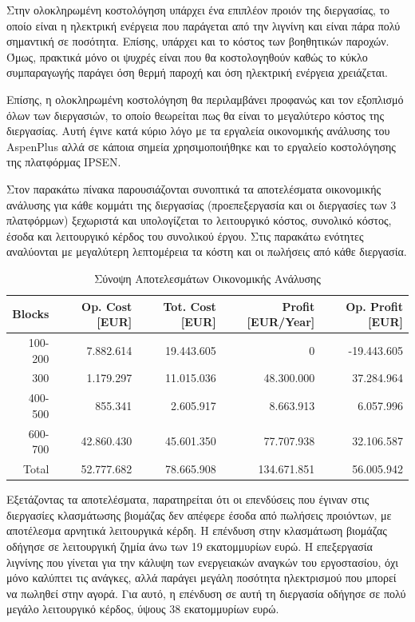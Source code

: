 \documentclass[11pt]{article}
\begin{document}
Στην ολοκληρωμένη κοστολόγηση υπάρχει ένα επιπλέον προιόν της διεργασίας, το οποίο είναι η ηλεκτρική ενέργεια που παράγεται από την λιγνίνη και είναι πάρα πολύ σημαντική σε ποσότητα. Επίσης, υπάρχει και το κόστος των βοηθητικών παροχών. Όμως, πρακτικά μόνο οι ψυχρές είναι που θα κοστολογηθούν καθώς το κύκλο συμπαραγωγής παράγει όση θερμή παροχή και όση ηλεκτρική ενέργεια χρειάζεται.

Επίσης, η ολοκληρωμένη κοστολόγηση θα περιλαμβάνει προφανώς και τον εξοπλισμό όλων των διεργασιών, το οποίο θεωρείται πως θα είναι το μεγαλύτερο κόστος της διεργασίας. Αυτή έγινε κατά κύριο λόγο με τα εργαλεία οικονομικής ανάλυσης του AspenPlus αλλά σε κάποια σημεία χρησιμοποιήθηκε και το εργαλείο κοστολόγησης της πλατφόρμας IPSEN.

Στον παρακάτω πίνακα παρουσιάζονται συνοπτικά τα αποτελέσματα οικονομικής
ανάλυσης για κάθε κομμάτι της διεργασίας (προεπεξεργασία και οι διεργασίες των 3 πλατφόρμων) ξεχωριστά και υπολογίζεται το λειτουργικό
κόστος, συνολικό κόστος, έσοδα και λειτουργικό κέρδος του συνολικού
έργου. Στις παρακάτω ενότητες αναλύονται με μεγαλύτερη λεπτομέρεια τα
κόστη και οι πωλήσεις από κάθε διεργασία.

\begin{table}[htbp]
\caption{Σύνοψη Αποτελεσμάτων Οικονομικής Ανάλυσης}
\centering
\begin{tabular}{rrrrr}
Blocks & Op. Cost [EUR] & Tot. Cost [EUR] & Profit [EUR/Year] & Op. Profit [ΕUR]\\
\hline
100-200 & 7.882.614 & 19.443.605 & 0 & -19.443.605\\
300 & 1.179.297 & 11.015.036 & 48.300.000 & 37.284.964\\
400-500 & 855.341 & 2.605.917 & 8.663.913 & 6.057.996\\
600-700 & 42.860.430 & 45.601.350 & 77.707.938 & 32.106.587\\
Total & 52.777.682 & 78.665.908 & 134.671.851 & 56.005.942\\
\end{tabular}
\end{table}

Εξετάζοντας τα αποτελέσματα, παρατηρείται ότι οι επενδύσεις που έγιναν
στις διεργασίες κλασμάτωσης βιομάζας δεν απέφερε έσοδα από πωλήσεις
προιόντων, με αποτέλεσμα αρνητικά λειτουργικά κέρδη. Η επένδυση στην
κλασμάτωση βιομάζας οδήγησε σε λειτουργική ζημία άνω των 19 εκατομμυρίων
ευρώ. Η επεξεργασία λιγνίνης που γίνεται για την κάλυψη των ενεργειακών
αναγκών του εργοστασίου, όχι μόνο καλύπτει τις ανάγκες, αλλά παράγει
μεγάλη ποσότητα ηλεκτρισμού που μπορεί να πωληθεί στην αγορά. Για αυτό,
η επένδυση σε αυτή τη διεργασία οδήγησε σε πολύ μεγάλο λειτουργικό
κέρδος, ύψους 38 εκατομμυρίων ευρώ.
\end{document}
